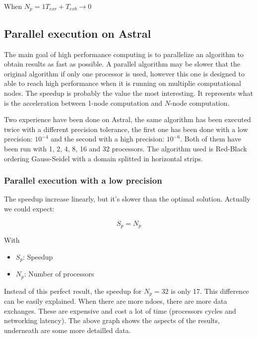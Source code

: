 \documentclass[a4paper,11pt]{article}
\begin{document}
When $N_p = 1$\hspace{2em}$T_{exr} + T_{exb} \rightarrow 0$

\subsection{Parallel execution on Astral}

The main goal of high performance computing is to parallelize an algorithm to obtain results as fast
as possible. A parallel algorithm may be slower that the original algorithm if only one processor is
used, however this one is designed to able to reach high performance when it is running on multiplie
computational nodes. The speedup is probably the value the most interesting. It represents what is
the acceleration between 1-node computation and $N$-node computation. 

Two experience have been done on Astral, the same algorithm has been executed twice with a different
precision tolerance, the first one has been done with a low precision: $10^{-4}$ and the second with
a high precision: $10^{-6}$. Both of them have been run with 1, 2, 4, 8, 16 and 32 processors. The
algorithm used is Red-Black ordering Gauss-Seidel with a domain splitted in horizontal strips.

\subsubsection{Parallel execution with a low precision}



The speedup increase linearly, but it's slower than the optimal solution. Actually we could expect:

$$S_p = N_p$$

With
\begin{itemize}
  \item{$S_p$: Speedup}
  \item{$N_p$: Number of processors}
\end{itemize}

Instead of this perfect result, the speedup for $N_p = 32$ is only 17. This difference can be easily
explained. When there are more ndoes, there are more data exchanges. These are expensive and cost
a lot of time (processors cycles and networking latency). The above graph shows the aspects of the results,
underneath are some more detailled data.
\end{document}
